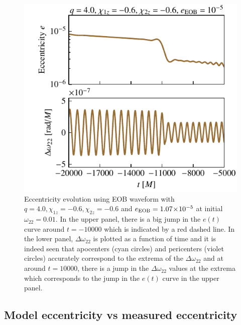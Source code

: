 \documentclass[aps,prd,amsmath,floats,floatfix, twocolumn,
superscriptaddress,nofootinbib,showpacs]{revtex4-1}
\newcommand{\into}{\!\times\!\relax} %
\newcommand{\eEOB}{e_{\text{EOB}}}
\newcommand{\resOmega}{\Delta \omega_{22}}
\begin{document}
\begin{figure}[thb]
  \centering
  \includegraphics[width=\columnwidth]{res_amp_glitches}
  \caption{Eccentricity evolution using EOB waveform with $q=4.0,
\chi_{1z}=-0.6, \chi_{2z}=-0.6$ and $\eEOB=1.07 \into 10^{-5}$ at
initial $\omega_{22} = 0.01$. In the upper panel, there is a big jump
in the $e(t)$ curve around $t=-10000$ which is indicated by a red
dashed line. In the lower panel, $\resOmega$ is plotted as a function
of time and it is indeed seen that apocenters (cyan circles) and
pericenters (violet circles) accurately correspond to the extrema of
the $\resOmega$ and at around $t=10000$, there is a jump in the
$\resOmega$ values at the extrema which corresponds to the jump in the
$e(t)$ curve in the upper panel.}
  \label{fig:res-amp-glitches}
\end{figure}

\subsection{Model eccentricity vs measured eccentricity}
\label{sec:model-ecc-vs-measured-ecc}
\end{document}
